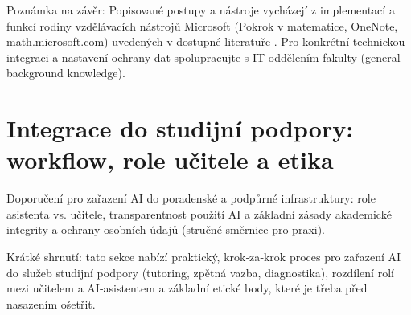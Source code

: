 \documentclass{report}%
\begin{document}
Poznámka na závěr: Popisované postupy a nástroje vycházejí z implementací a funkcí rodiny vzdělávacích nástrojů Microsoft (Pokrok v matematice, OneNote, math.microsoft.com) uvedených v dostupné literatuře \cite{kb_ai_101_tipu_pdf_04e4a115_page_8_1, kb_ai_101_tipu_pdf_04e4a115_page_3_1}. Pro konkrétní technickou integraci a nastavení ochrany dat spolupracujte s IT oddělením fakulty (general background knowledge).%

%
\section{Integrace do studijní podpory: workflow, role učitele a etika}%
Doporučení pro zařazení AI do poradenské a podpůrné infrastruktury: role asistenta vs. učitele, transparentnost použití AI a základní zásady akademické integrity a ochrany osobních údajů (stručné směrnice pro praxi).%


%
Krátké shrnutí: tato sekce nabízí praktický, krok‑za‑krok proces pro zařazení AI do služeb studijní podpory (tutoring, zpětná vazba, diagnostika), rozdílení rolí mezi učitelem a AI‑asistentem a základní etické body, které je třeba před nasazením ošetřit.
\end{document}
